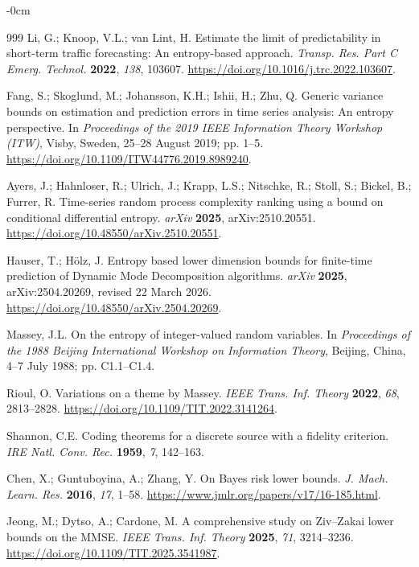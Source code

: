 \documentclass[applsci,article,submit,moreauthors]{Definitions/mdpi}
\begin{document}
\begin{adjustwidth}{-\extralength}{0cm}
\begin{thebibliography}{999}
Li, G.; Knoop, V.L.; van Lint, H. Estimate the limit of predictability in
short-term traffic forecasting: An entropy-based approach.
\emph{Transp. Res. Part C Emerg. Technol.} \textbf{2022}, \emph{138},
103607. \url{https://doi.org/10.1016/j.trc.2022.103607}.

Fang, S.; Skoglund, M.; Johansson, K.H.; Ishii, H.; Zhu, Q.
Generic variance bounds on estimation and prediction errors in time series
analysis: An entropy perspective. In \emph{Proceedings of the 2019 IEEE
Information Theory Workshop (ITW)}, Visby, Sweden, 25--28 August 2019;
pp. 1--5. \url{https://doi.org/10.1109/ITW44776.2019.8989240}.

Ayers, J.; Hahnloser, R.; Ulrich, J.; Krapp, L.S.; Nitschke, R.; Stoll, S.;
Bickel, B.; Furrer, R. Time-series random process complexity ranking using a
bound on conditional differential entropy. \emph{arXiv} \textbf{2025},
arXiv:2510.20551. \url{https://doi.org/10.48550/arXiv.2510.20551}.

Hauser, T.; H\"olz, J. Entropy based lower dimension bounds for finite-time
prediction of Dynamic Mode Decomposition algorithms. \emph{arXiv}
\textbf{2025}, arXiv:2504.20269, revised 22 March 2026.
\url{https://doi.org/10.48550/arXiv.2504.20269}.

Massey, J.L. On the entropy of integer-valued random variables. In
\emph{Proceedings of the 1988 Beijing International Workshop on Information
Theory}, Beijing, China, 4--7 July 1988; pp. C1.1--C1.4.

Rioul, O. Variations on a theme by Massey.
\emph{IEEE Trans. Inf. Theory} \textbf{2022}, \emph{68}, 2813--2828.
\url{https://doi.org/10.1109/TIT.2022.3141264}.

Shannon, C.E. Coding theorems for a discrete source with a fidelity
criterion. \emph{IRE Natl. Conv. Rec.} \textbf{1959}, \emph{7},
142--163.

Chen, X.; Guntuboyina, A.; Zhang, Y. On Bayes risk lower bounds.
\emph{J. Mach. Learn. Res.} \textbf{2016}, \emph{17}, 1--58.
\url{https://www.jmlr.org/papers/v17/16-185.html}.

Jeong, M.; Dytso, A.; Cardone, M. A comprehensive study on Ziv--Zakai
lower bounds on the MMSE. \emph{IEEE Trans. Inf. Theory} \textbf{2025},
\emph{71}, 3214--3236.
\url{https://doi.org/10.1109/TIT.2025.3541987}.


\end{thebibliography}
\end{adjustwidth}
\end{document}
